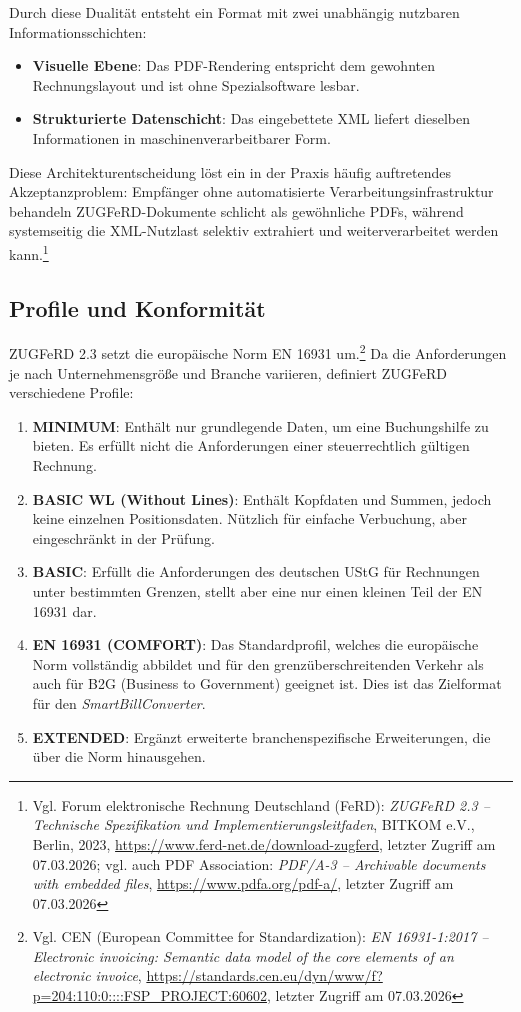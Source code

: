 Durch diese Dualität entsteht ein Format mit zwei unabhängig nutzbaren Informationsschichten:
\begin{itemize}
    \item \textbf{Visuelle Ebene}: Das PDF-Rendering entspricht dem gewohnten Rechnungslayout und ist ohne Spezialsoftware lesbar.
    \item \textbf{Strukturierte Datenschicht}: Das eingebettete XML liefert dieselben Informationen in maschinenverarbeitbarer Form.
\end{itemize}
Diese Architekturentscheidung löst ein in der Praxis häufig auftretendes Akzeptanzproblem: Empfänger ohne automatisierte Verarbeitungsinfrastruktur behandeln ZUGFeRD-Dokumente schlicht als gewöhnliche PDFs, während systemseitig die XML-Nutzlast selektiv extrahiert und weiterverarbeitet werden kann.\footnote{Vgl. Forum elektronische Rechnung Deutschland (FeRD): \textit{ZUGFeRD 2.3 -- Technische Spezifikation und Implementierungsleitfaden}, BITKOM e.V., Berlin, 2023, \url{https://www.ferd-net.de/download-zugferd}, letzter Zugriff am 07.03.2026; vgl. auch PDF Association: \textit{PDF/A-3 -- Archivable documents with embedded files}, \url{https://www.pdfa.org/pdf-a/}, letzter Zugriff am 07.03.2026}

\subsection{Profile und Konformität}
ZUGFeRD 2.3 setzt die europäische Norm EN 16931 um.\footnote{Vgl. CEN (European Committee for Standardization): \textit{EN 16931-1:2017 -- Electronic invoicing: Semantic data model of the core elements of an electronic invoice}, \url{https://standards.cen.eu/dyn/www/f?p=204:110:0::::FSP_PROJECT:60602}, letzter Zugriff am 07.03.2026} Da die Anforderungen je nach Unternehmensgröße und Branche variieren, definiert ZUGFeRD verschiedene Profile:

\begin{enumerate}
    \item \textbf{MINIMUM}: Enthält nur grundlegende Daten, um eine Buchungshilfe zu bieten. Es erfüllt nicht die Anforderungen einer steuerrechtlich gültigen Rechnung.
    \item \textbf{BASIC WL (Without Lines)}: Enthält Kopfdaten und Summen, jedoch keine einzelnen Positionsdaten. Nützlich für einfache Verbuchung, aber eingeschränkt in der Prüfung.
    \item \textbf{BASIC}: Erfüllt die Anforderungen des deutschen UStG für Rechnungen unter bestimmten Grenzen, stellt aber eine nur einen kleinen Teil der EN 16931 dar.
    \item \textbf{EN 16931 (COMFORT)}: Das Standardprofil, welches die europäische Norm vollständig abbildet und für den grenzüberschreitenden Verkehr als auch für B2G (Business to Government) geeignet ist. Dies ist das Zielformat für den \textit{SmartBillConverter}.
    \item \textbf{EXTENDED}: Ergänzt erweiterte branchenspezifische Erweiterungen, die über die Norm hinausgehen.
\end{enumerate}

